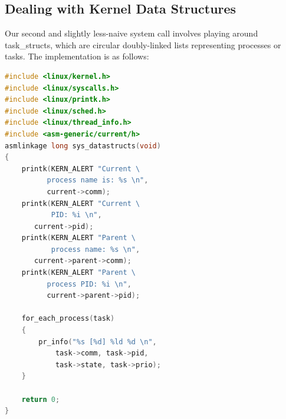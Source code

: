 \documentclass{article}
\begin{document}
\subsection{Dealing with Kernel Data Structures}
Our second and slightly less-naive system call involves playing around task\_structs, which are circular doubly-linked lists representing processes or tasks. 
The implementation is as follows:
\begin{lstlisting}[language=C]
#include <linux/kernel.h>
#include <linux/syscalls.h>
#include <linux/printk.h>
#include <linux/sched.h>
#include <linux/thread_info.h>
#include <asm-generic/current/h>
asmlinkage long sys_datastructs(void)
{
    printk(KERN_ALERT "Current \
          process name is: %s \n", 
          current->comm);
    printk(KERN_ALERT "Current \
    	   PID: %i \n", 
	   current->pid);
    printk(KERN_ALERT "Parent \
    	   process name: %s \n",
	   current->parent->comm);
    printk(KERN_ALERT "Parent \
          process PID: %i \n", 
          current->parent->pid);
 	
    for_each_process(task)
    {
        pr_info("%s [%d] %ld %d \n", 
            task->comm, task->pid, 
            task->state, task->prio);
    }
    
    return 0;
}

\end{lstlisting} 
\end{document}
